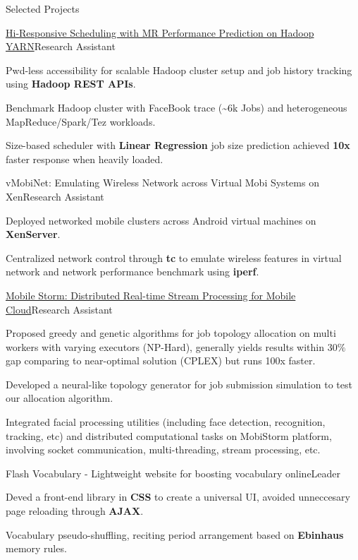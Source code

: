 \documentclass{resume} %
\begin{document}
\begin{rSection}{Selected Projects}
\begin{rSubsection}{\href{http://ieeexplore.ieee.org/document/7579961/}{Hi-Responsive Scheduling with MR Performance Prediction on Hadoop YARN}}{Research Assistant}{}{}
\item Pwd-less accessibility for scalable Hadoop cluster setup and job history tracking using \textbf{Hadoop REST APIs}.
\item Benchmark Hadoop cluster with FaceBook trace (\textasciitilde 6k Jobs) and heterogeneous MapReduce/Spark/Tez workloads. 
\item Size-based scheduler with \textbf{Linear Regression} job size prediction achieved \textbf{10x} faster response when heavily loaded.
\end{rSubsection}

\begin{rSubsection}{vMobiNet: Emulating Wireless Network across Virtual Mobi Systems on Xen}{Research Assistant}{}{}
\item Deployed networked mobile clusters across Android virtual machines on \textbf{XenServer}.
\item Centralized network control through \textbf{tc} to emulate wireless features in virtual network and network performance benchmark using \textbf{iperf}.
\end{rSubsection}

\begin{rSubsection}{\href{http://ieeexplore.ieee.org/document/7335296/?arnumber=7335296}{Mobile Storm: Distributed Real-time Stream Processing for Mobile Cloud}}{Research Assistant}{}{}
\item Proposed greedy and genetic algorithms for job topology allocation on multi workers with varying executors (NP-Hard), generally yields results within $30\%$ gap comparing to near-optimal solution (CPLEX) but runs 100x faster.
\item Developed a neural-like topology generator for job submission simulation to test our allocation algorithm.
\item Integrated facial processing utilities (including face detection, recognition, tracking, etc) and distributed computational tasks on MobiStorm platform, involving socket communication, multi-threading, stream processing, etc.
\end{rSubsection}

\begin{rSubsection}{Flash Vocabulary - Lightweight website for boosting vocabulary online}{Leader}{}{}
\item Deved a front-end library in \textbf{CSS} to create a universal UI, avoided unneccesary page reloading through \textbf{AJAX}.
\item Vocabulary pseudo-shuffling, reciting period arrangement based on \textbf{Ebinhaus} memory rules.
\end{rSubsection}


\end{rSection}
\end{document}
